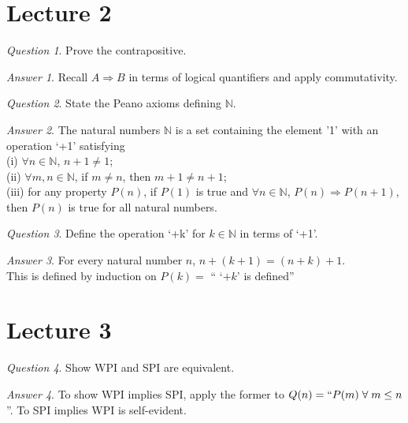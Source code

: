 \documentclass[]{article}
\def\naturals{\mathbb{N}}
\theoremstyle{remark}
\theoremstyle{qnstyle}
\newtheorem{question}{Question}
\theoremstyle{answerstyle}
\newtheorem*{answer}{Answer}
\begin{document}
\noindent






\section* {Lecture 2}

\begin{question}
    Prove the contrapositive.
\end{question}
\begin{answer}
    Recall $A \Rightarrow B$ in terms of logical quantifiers and apply commutativity.
\end{answer}

\begin{question}
    State the Peano axioms defining $\mathbb{N}$.
\end{question}
\begin{answer}
    The natural numbers $\naturals$ is a set containing the element '1' 
    with an operation `+1' satisfying \\
    (i) $\forall n \in \naturals$, $n+1 \neq 1$; \\
    (ii) $\forall m,n \in \naturals$, if $m \neq n$, then $m+1 \neq n+1$; \\
    (iii) for any property $P(n)$, if $P(1)$ is true and $\forall n \in \naturals$,
    $P(n) \Rightarrow P(n+1)$, then $P(n)$ is true for all natural numbers.
\end{answer}

\begin{question}
    Define the operation `+k' for $k \in \naturals$ in terms of `+1'.
\end{question}
\begin{answer}
    For every natural number $n$, $n+(k+1) = (n+k)+1$.\\
    This is defined by induction on $P(k) =$ `` `$+k$' is defined''
\end{answer}





\section* {Lecture 3}

\begin{question}
    Show WPI and SPI are equivalent.
\end{question}
\begin{answer}
    To show WPI implies SPI, apply the former to $Q(n) = ``P(m)\; \forall\; m \leq n$''.
    To SPI implies WPI is self-evident.
\end{answer}
\end{document}
